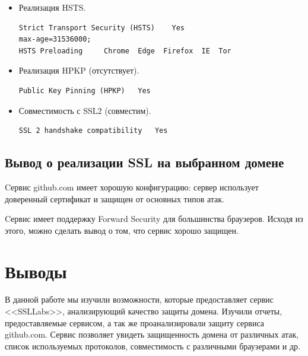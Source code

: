 \documentclass[10pt,a4paper]{report}
\begin{document}
\begin{itemize}
				\item Реализация HSTS.
				\begin{lstlisting}
Strict Transport Security (HSTS)	Yes
max-age=31536000;
HSTS Preloading	 	Chrome  Edge  Firefox  IE  Tor   
				\end{lstlisting}
				
				\item Реализация HPKP (отсутствует).
				\begin{lstlisting}
Public Key Pinning (HPKP)	Yes
				\end{lstlisting}
				
				\item Совместимость с SSL2 (совместим).
				\begin{lstlisting}
SSL 2 handshake compatibility	Yes
				\end{lstlisting}
			\end{itemize}
		
		\subsection{Вывод о реализации SSL на выбранном домене}
			Cервис github.com имеет хорошую конфигурацию: сервер 
			использует доверенный сертификат и защищен от основных типов атак.
			
			Cервис имеет поддержку Forward Security для большинства браузеров.
			Исходя из этого, можно сделать вывод о том, что сервис хорошо защищен.
	
	\section{Выводы}
		В данной работе мы изучили возможности, которые предоставляет сервис <<SSLLabs>>, 
		анализирующий качество защиты домена.
		Изучили отчеты, предоставляемые сервисом, а так же проанализировали 
		защиту сервиса github.com.
		Сервис позволяет увидеть защищенность домена от различных атак,
		список используемых протоколов, совместимость с различными браузерами и др.
\end{document}

